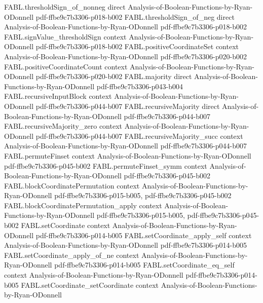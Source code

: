 \begin{theorem}
\proofstep
  {FABL.thresholdSign_of_nonneg}
  {direct}
  {Analysis-of-Boolean-Functions-by-Ryan-ODonnell}
  {pdf-ffbe9c7b3306-p018-b002}
\proofstep
  {FABL.thresholdSign_of_neg}
  {direct}
  {Analysis-of-Boolean-Functions-by-Ryan-ODonnell}
  {pdf-ffbe9c7b3306-p018-b002}
\proofstep
  {FABL.signValue_thresholdSign}
  {context}
  {Analysis-of-Boolean-Functions-by-Ryan-ODonnell}
  {pdf-ffbe9c7b3306-p018-b002}
\proofstep
  {FABL.positiveCoordinateSet}
  {context}
  {Analysis-of-Boolean-Functions-by-Ryan-ODonnell}
  {pdf-ffbe9c7b3306-p020-b002}
\proofstep
  {FABL.positiveCoordinateCount}
  {context}
  {Analysis-of-Boolean-Functions-by-Ryan-ODonnell}
  {pdf-ffbe9c7b3306-p020-b002}
\proofstep
  {FABL.majority}
  {direct}
  {Analysis-of-Boolean-Functions-by-Ryan-ODonnell}
  {pdf-ffbe9c7b3306-p043-b004}
\proofstep
  {FABL.recursiveInputBlock}
  {context}
  {Analysis-of-Boolean-Functions-by-Ryan-ODonnell}
  {pdf-ffbe9c7b3306-p044-b007}
\proofstep
  {FABL.recursiveMajority}
  {direct}
  {Analysis-of-Boolean-Functions-by-Ryan-ODonnell}
  {pdf-ffbe9c7b3306-p044-b007}
\proofstep
  {FABL.recursiveMajority_zero}
  {context}
  {Analysis-of-Boolean-Functions-by-Ryan-ODonnell}
  {pdf-ffbe9c7b3306-p044-b007}
\proofstep
  {FABL.recursiveMajority_succ}
  {context}
  {Analysis-of-Boolean-Functions-by-Ryan-ODonnell}
  {pdf-ffbe9c7b3306-p044-b007}
\proofstep
  {FABL.permuteFinset}
  {context}
  {Analysis-of-Boolean-Functions-by-Ryan-ODonnell}
  {pdf-ffbe9c7b3306-p045-b002}
\proofstep
  {FABL.permuteFinset_symm}
  {context}
  {Analysis-of-Boolean-Functions-by-Ryan-ODonnell}
  {pdf-ffbe9c7b3306-p045-b002}
\proofstep
  {FABL.blockCoordinatePermutation}
  {context}
  {Analysis-of-Boolean-Functions-by-Ryan-ODonnell}
  {pdf-ffbe9c7b3306-p015-b005,
    pdf-ffbe9c7b3306-p045-b002}
\proofstep
  {FABL.blockCoordinatePermutation_apply}
  {context}
  {Analysis-of-Boolean-Functions-by-Ryan-ODonnell}
  {pdf-ffbe9c7b3306-p015-b005,
    pdf-ffbe9c7b3306-p045-b002}
\proofstep
  {FABL.setCoordinate}
  {context}
  {Analysis-of-Boolean-Functions-by-Ryan-ODonnell}
  {pdf-ffbe9c7b3306-p014-b005}
\proofstep
  {FABL.setCoordinate_apply_self}
  {context}
  {Analysis-of-Boolean-Functions-by-Ryan-ODonnell}
  {pdf-ffbe9c7b3306-p014-b005}
\proofstep
  {FABL.setCoordinate_apply_of_ne}
  {context}
  {Analysis-of-Boolean-Functions-by-Ryan-ODonnell}
  {pdf-ffbe9c7b3306-p014-b005}
\proofstep
  {FABL.setCoordinate_eq_self}
  {context}
  {Analysis-of-Boolean-Functions-by-Ryan-ODonnell}
  {pdf-ffbe9c7b3306-p014-b005}
\proofstep
  {FABL.setCoordinate_setCoordinate}
  {context}
  {Analysis-of-Boolean-Functions-by-Ryan-ODonnell}

\end{theorem}
